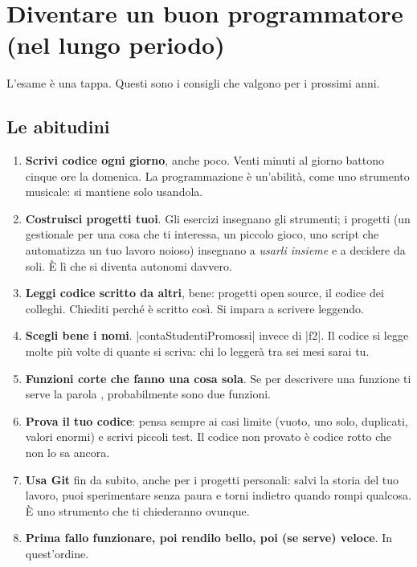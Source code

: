 \section{Diventare un buon programmatore (nel lungo periodo)}

L'esame è una tappa. Questi sono i consigli che valgono per i prossimi anni.

\subsection*{Le abitudini}

\begin{enumerate}
  \item \textbf{Scrivi codice ogni giorno}, anche poco. Venti minuti al giorno battono
        cinque ore la domenica. La programmazione è un'abilità, come uno strumento
        musicale: si mantiene solo usandola.
  \item \textbf{Costruisci progetti tuoi}. Gli esercizi insegnano gli strumenti; i progetti
        (un gestionale per una cosa che ti interessa, un piccolo gioco, uno script che
        automatizza un tuo lavoro noioso) insegnano a \emph{usarli insieme} e a decidere da
        soli. È lì che si diventa autonomi davvero.
  \item \textbf{Leggi codice scritto da altri}, bene: progetti open source, il codice dei
        colleghi. Chiediti perché è scritto così. Si impara a scrivere leggendo.
  \item \textbf{Scegli bene i nomi}. \cc|contaStudentiPromossi| invece di \cc|f2|.
        Il codice si legge molte più volte di quante si scriva: chi lo leggerà tra sei
        mesi sarai tu.
  \item \textbf{Funzioni corte che fanno una cosa sola}. Se per descrivere una funzione
        ti serve la parola , probabilmente sono due funzioni.
  \item \textbf{Prova il tuo codice}: pensa sempre ai casi limite (vuoto, uno solo,
        duplicati, valori enormi) e scrivi piccoli test. Il codice non provato è codice
        rotto che non lo sa ancora.
  \item \textbf{Usa Git} fin da subito, anche per i progetti personali: salvi la storia
        del tuo lavoro, puoi sperimentare senza paura e torni indietro quando rompi
        qualcosa. È uno strumento che ti chiederanno ovunque.
  \item \textbf{Prima fallo funzionare, poi rendilo bello, poi (se serve) veloce}. In
        quest'ordine.
\end{enumerate}

